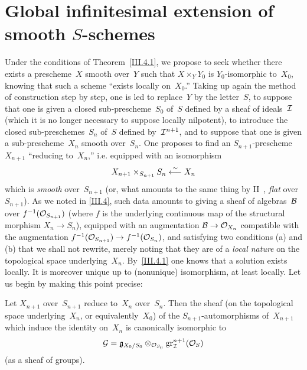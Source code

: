 \section{Global infinitesimal extension of smooth $S$-schemes}
\label{III.6}

Under the conditions of Theorem~\ref{III.4.1}, we propose to seek whether there exists a prescheme~$X$ smooth over~$Y$ such that
$X\times_YY_0$ is $Y_0$-isomorphic to~$X_0$, knowing that such a scheme ``exists locally on~$X_0$.'' Taking up again the method
of construction step by step, one is led to replace~$Y$ by the letter~$S$, to suppose that one is given a closed
sub-prescheme~$S_0$ of~$S$ defined by a sheaf of ideals~$\cal{I}$ (which it is no longer necessary to suppose locally
nilpotent), to introduce the closed sub-preschemes~$S_n$ of~$S$ defined by~$\cal{I}^{n+1}$, and to suppose that one is given
a sub-prescheme~$X_n$ smooth over~$S_n$. One proposes to find an $S_{n+1}$-prescheme~$X_{n+1}$ ``reducing to~$X_n$,'' i.e. equipped with an isomorphism
\begin{equation*}
X_{n+1}\times_{S_{n+1}}S_n\isomfrom X_n
\end{equation*}
which is \emph{smooth} over~$S_{n+1}$ (or, what amounts to the same thing by II~, \emph{flat} over~$S_{n+1}$). As we noted in \No\ref{III.4}, such data amounts to giving a sheaf of algebras~$\cal{B}$ over $f^{-1}(\cal{O}_{S_{n+1}})$ (where $f$ is the underlying continuous map of the structural morphism $X_n\to S_n$), equipped with an augmentation $\cal{B}\to\cal{O}_{X_n}$ compatible with the augmentation $f^{-1}(\cal{O}_{S_{n+1}})\to f^{-1}(\cal{O}_{S_n})$, and satisfying two conditions (a) and (b) that we shall not rewrite, merely noting that they are of a \emph{local nature} on the topological space underlying~$X_n$. By~\ref{III.4.1} one knows that a solution exists locally. It is moreover unique up to (nonunique) isomorphism, at least locally. Let us begin by making this point precise:

\begin{proposition}
\label{III.6.1}
Let
$X_{n+1}$ over~$S_{n+1}$ reduce to~$X_n$ over~$S_n$. Then the sheaf (on the topological space underlying~$X_n$, or equivalently~$X_0$) of the $S_{n+1}$-automorphisms of~$X_{n+1}$ which induce the identity on~$X_n$ is canonically isomorphic to
\begin{equation*}
\cal{G}=\goth{g}_{X_0/S_0}\otimes_{\cal{O}_{S_0}}
\gr_{\cal{I}}^{n+1}(\cal{O}_S)
\end{equation*}
(as a sheaf of groups).
\end{proposition}

